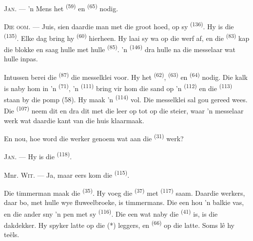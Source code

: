 \textsc{Jan}. --- 'n Mens het  \textsuperscript{(59)} en
 \textsuperscript{(65)} nodig.

\textsc{Die oom}. --- Juis, sien daardie man met die groot hoed, op sy 
\textsuperscript{(136)}. Hy is die  \textsuperscript{(135)}. Elke dag
bring hy  \textsuperscript{(60)} hierheen. Hy laai sy wa op die werf
af, en die  \textsuperscript{(83)} kap die blokke en saag hulle met
hulle  \textsuperscript{(85)}. 'n 
\textsuperscript{(146)} dra hulle na die messelaar wat hulle inpas.

Intussen berei die  \textsuperscript{(87)} die messelklei voor. Hy het
 \textsuperscript{(62)},  \textsuperscript{(63)} en
 \textsuperscript{(64)} nodig. Die kalk is naby hom in 'n 
\textsuperscript{(71)}, 'n  \textsuperscript{(111)} bring vir hom
die sand op 'n  \textsuperscript{(112)} en die 
\textsuperscript{(113)} staan by die pomp (58). Hy maak 'n 
\textsuperscript{(114)} vol. Die messelklei sal gou gereed wees. Die
 \textsuperscript{(107)} neem dit en dra dit met die leer op tot op die
steier, waar 'n messelaar werk wat daardie kant van die huis klaarmaak.

En nou, hoe word die werker genoem wat aan die  \textsuperscript{(31)}
werk?

\textsc{Jan}. --- Hy is die  \textsuperscript{(118)}.

\VUsaut{3.0mm}
\VUsaut{3.0mm}

Mnr. \textsc{Wit}. --- Ja, maar eers kom die 
\textsuperscript{(115)}.

Die timmerman maak die  \textsuperscript{(35)}. Hy voeg die
 \textsuperscript{(37)} met  \textsuperscript{(117)}
saam. Daardie werkers, daar bo, met hulle wye fluweelbroeke, is timmermans. Die een hou
'n balkie vas, en die ander sny 'n pen met sy  \textsuperscript{(116)}. Die
een wat naby die  \textsuperscript{(41)} is, is die dakdekker. Hy
spyker latte op die (*) leggers, en  \textsuperscript{(66)} op die
latte. Soms lê hy teëls.

